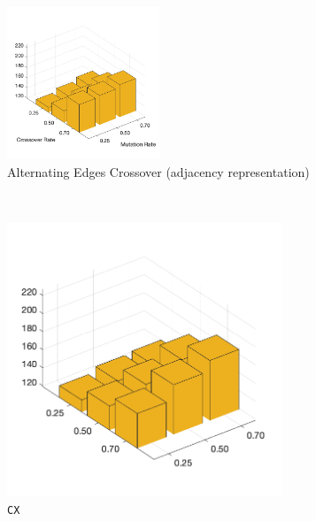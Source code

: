 \begin{figure}[H]
	\centering
%
	\begin{subfigure}[b]{0.7\textwidth}
		\centering
		\includegraphics[width=0.5\textwidth]{crossover/min/cross_alt_edges_3.png}
		\caption{Alternating Edges Crossover (adjacency representation)}
		\label{fig:z}
    	\end{subfigure}\\
%
	\begin{subfigure}[b]{0.25\textwidth}
		\centering
		\includegraphics[width=0.9\textwidth]{crossover/min/cross_cycle_3.png}
		\caption{\texttt{CX}}
		\label{fig:x}
    	\end{subfigure}
%
	\begin{subfigure}[b]{0.25\textwidth}
		\centering

\end{subfigure}
\end{figure}
